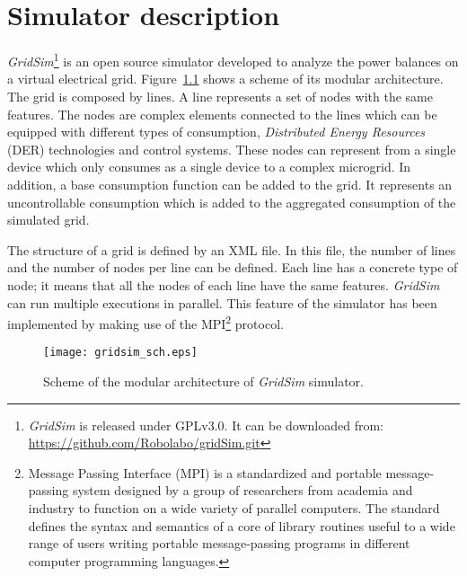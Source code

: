 \chapter{Simulator description}
\label{chap:description}



{\it GridSim}\footnote{
{\it GridSim} is released under GPLv3.0.
It can be downloaded from: \href{https://github.com/Robolabo/gridSim.git}{https://github.com/Robolabo/gridSim.git} 
} is an open source simulator developed to analyze the power balances on a virtual electrical grid.
Figure~\ref{fig:gridsim_sch} shows a scheme of its modular architecture.
The grid is composed by lines.
A line represents a set of nodes with the same features.
The nodes are complex elements connected to the lines which can be equipped with different types of consumption, {\it Distributed Energy Resources} (DER) technologies and control systems.
These nodes can represent from a single device which only consumes as a single device to a complex microgrid.
In addition, a base consumption function can be added to the grid.
It represents an uncontrollable consumption which is added to the aggregated consumption of the simulated grid.

The structure of a grid is defined by an XML file.
In this file, the number of lines and the number of nodes per line can be defined.
Each line has a concrete type of node; 
it means that all the nodes of each line have the same features.
{\it GridSim} can run multiple executions in parallel.
This feature of the simulator has been implemented by making use of the MPI\footnote{
Message Passing Interface (MPI) is a standardized and portable message-passing system designed by a group of researchers from academia and industry to function on a wide variety of parallel computers.
The standard defines the syntax and semantics of a core of library routines useful to a wide range of users writing portable message-passing programs in different computer programming languages.
} protocol.
\begin{figure}[!t]	
	\begin{center}
		\texttt{[image: gridsim\_sch.eps]} \\ 
		\caption[Scheme of the modular architecture of {\it GridSim} simulator.]
		{Scheme of the modular architecture of {\it GridSim} simulator.}		
		\label{fig:gridsim_sch}	
	\end{center}
\end{figure}


